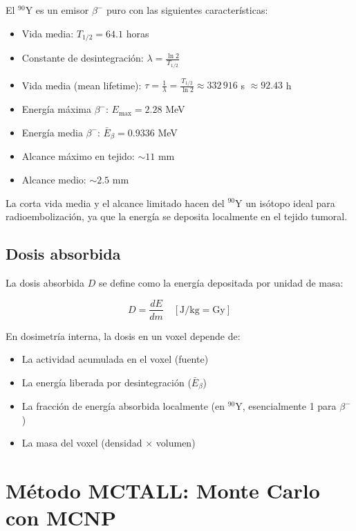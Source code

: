 \documentclass[12pt,a4paper]{article}
\begin{document}
El $^{90}$Y es un emisor $\beta^-$ puro con las siguientes características:

\begin{itemize}
    \item Vida media: $T_{1/2} = 64.1$ horas
    \item Constante de desintegración: $\lambda = \frac{\ln 2}{T_{1/2}}$
    \item Vida media (mean lifetime): $\tau = \frac{1}{\lambda} = \frac{T_{1/2}}{\ln 2} \approx 332\,916$ s $\approx 92.43$ h
    \item Energía máxima $\beta^-$: $E_{\max} = 2.28$ MeV
    \item Energía media $\beta^-$: $\bar{E}_\beta = 0.9336$ MeV
    \item Alcance máximo en tejido: $\sim 11$ mm
    \item Alcance medio: $\sim 2.5$ mm
\end{itemize}

La corta vida media y el alcance limitado hacen del $^{90}$Y un isótopo
ideal para radioembolización, ya que la energía se deposita localmente en
el tejido tumoral.

\subsection{Dosis absorbida}

La dosis absorbida $D$ se define como la energía depositada por unidad de
masa:

\begin{equation}
    D = \frac{dE}{dm} \quad [\text{J/kg} = \text{Gy}]
\end{equation}

En dosimetría interna, la dosis en un voxel depende de:
\begin{itemize}
    \item La actividad acumulada en el voxel (fuente)
    \item La energía liberada por desintegración ($\bar{E}_\beta$)
    \item La fracción de energía absorbida localmente (en $^{90}$Y,
        esencialmente 1 para $\beta^-$)
    \item La masa del voxel (densidad $\times$ volumen)
\end{itemize}

\section{Método MCTALL: Monte Carlo con MCNP}
\end{document}
